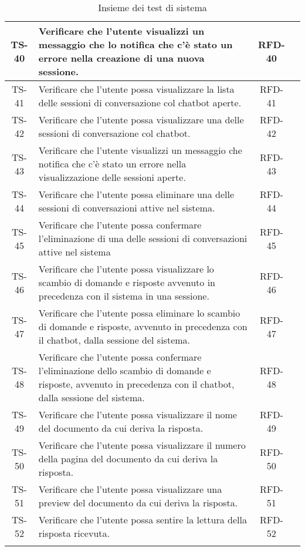 \begin{xltabular}{\textwidth}{| c | X | c | c |}
    \hline
    TS-40 & Verificare che l'utente visualizzi un messaggio che lo notifica che c'è stato un errore nella creazione di una nuova sessione. & RFD-40 & \textcolor{xmarkcolor}{} \\
    \hline
    TS-41 & Verificare che l'utente possa visualizzare la lista delle sessioni di conversazione col chatbot aperte. & RFD-41 & \textcolor{xmarkcolor}{} \\
    \hline
    TS-42 & Verificare che l'utente possa visualizzare una delle sessioni di conversazione col chatbot. & RFD-42 & \textcolor{xmarkcolor}{} \\
    \hline
    TS-43 & Verificare che l'utente visualizzi un messaggio che notifica che c'è stato un errore nella visualizzazione delle sessioni aperte. & RFD-43 & \textcolor{xmarkcolor}{} \\
    \hline
    TS-44 & Verificare che l'utente possa eliminare una delle sessioni di conversazioni attive nel sistema. & RFD-44 & \textcolor{xmarkcolor}{} \\
    \hline
    TS-45 & Verificare che l'utente possa confermare l'eliminazione di una delle sessioni di conversazioni attive nel sistema & RFD-45 & \textcolor{xmarkcolor}{} \\
    \hline
    TS-46 & Verificare che l'utente possa visualizzare lo scambio di domande e risposte avvenuto in precedenza con il sistema in una sessione. & RFD-46 & \textcolor{xmarkcolor}{} \\
    \hline
    TS-47 & Verificare che l'utente possa eliminare lo scambio di domande e risposte, avvenuto in precedenza con il chatbot, dalla sessione del sistema. & RFD-47 & \textcolor{xmarkcolor}{} \\
    \hline
    TS-48 & Verificare che l'utente possa confermare l'eliminazione dello scambio di domande e risposte, avvenuto in precedenza con il chatbot, dalla sessione del sistema. & RFD-48 & \textcolor{xmarkcolor}{} \\
    \hline
    TS-49 & Verificare che l'utente possa visualizzare il nome del documento da cui deriva la risposta. & RFD-49 & \textcolor{xmarkcolor}{} \\
    \hline
    TS-50 & Verificare che l'utente possa visualizzare il numero della pagina del documento da cui deriva la risposta. & RFD-50 & \textcolor{xmarkcolor}{} \\
    \hline
    TS-51 & Verificare che l'utente possa visualizzare una preview del documento da cui deriva la risposta. & RFD-51 & \textcolor{xmarkcolor}{} \\
    \hline
    TS-52 & Verificare che l'utente possa sentire la lettura della risposta ricevuta. & RFD-52 & \textcolor{xmarkcolor}{} \\
    \hline
     \caption{Insieme dei test di sistema}
    \label{tab:test}
\end{xltabular}
\endgroup
